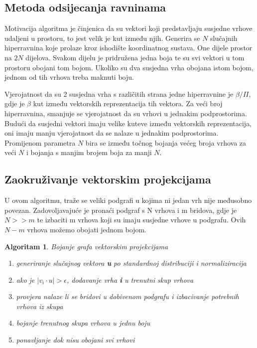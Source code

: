 \documentclass[diplomskirad]{fer}
\newtheorem{algoritam}{Algoritam}
\begin{document}
\subsection{Metoda odsijecanja ravninama}
Motivacija algoritma je činjenica da su vektori koji predstavljaju susjedne vrhove udaljeni u prostoru, to jest velik je kut između njih.
Generira se $N$ slučajnih hiperravnina koje prolaze kroz ishodište koordinatnog sustava. One dijele prostor na $2N$ dijelova. Svakom dijelu je pridružena
jedna boja te su svi vektori u tom prostoru obojani tom bojom. Ukoliko su dva susjedna vrha obojana istom bojom, jednom od tih vrhova treba maknuti boju.

Vjerojatnost da su 2 susjedna vrha s različitih strana jedne hiperravnine je $\beta / \Pi$, gdje je $\beta$ kut između vektorskih reprezentacija
tih vektora. Za veći broj hiperravnina, smanjuje se vjerojatnost da su vrhovi u jednakim podprostorima.
Budući da susjedni vektori imaju velike kuteve između vektorskih reprezentacija, oni imaju manju vjerojatnost da se nalaze u jednakim podprostorima.
Promijenom parametra $N$ bira se između točnog bojanja većeg broja vrhova za veći $N$ i bojanja s manjim brojem boja za manji $N$. \cite{karger1998approximategraphcoloringsemidefinite} 


\subsection{Zaokruživanje vektorskim projekcijama}
\label{pog_vektorske_projekcije}
U ovom algoritmu, traže se veliki podgrafi u kojima ni jedan vrh nije međusobno povezan. Zadovoljavajuće je pronaći podgraf s N vrhova i m bridova,
gdje je $N >> m$ te izbaciti m vrhova koji su imaju susjedne vrhove u podgrafu. Ovih $N - m$ vrhova možemo obojati jednom bojom.

\begin{algoritam} Bojanje grafa vektorskim projekcijama
  \begin{enumerate}
    \item generiranje slučajnog vektora \textbf{u} po standardnoj distribuciji i normaliziracija
    \item ako je $|v_i \cdot u| > \epsilon$, dodavanje vrha \textbf{i} u trenutni skup vrhova 
    \item provjera nalaze li se bridovi u dobivenom podgrafu i izbacivanje potrebnih vrhova iz skupa
    \item bojanje trenutnog skupa vrhova u jednu boju
    \item ponavljanje dok nisu obojani svi vrhovi
  \end{enumerate}
\end{algoritam}
\end{document}
